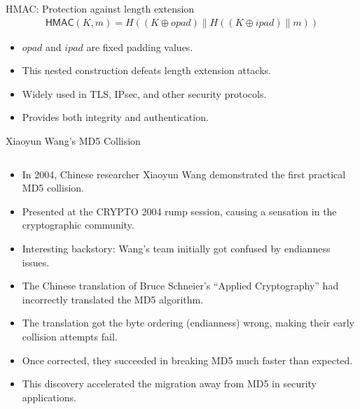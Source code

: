 \documentclass[aspectratio=169, lualatex, handout]{beamer}
\begin{document}
\begin{frame}{HMAC: Protection against length extension}
	\begin{align*}
		\textsf{HMAC}(K, m) = H((K \oplus opad) \| H((K \oplus ipad) \| m))
	\end{align*}
	\begin{itemize}[<+->]
		\item $opad$ and $ipad$ are fixed padding values.
		\item This nested construction defeats length extension attacks.
		\item Widely used in TLS, IPsec, and other security protocols.
		\item Provides both integrity and authentication.
	\end{itemize}
\end{frame}

\begin{frame}{Xiaoyun Wang's MD5 Collision}
	\begin{columns}[c]
		\begin{column}{1\textwidth}
			\begin{itemize}[<+->]
				\item In 2004, Chinese researcher Xiaoyun Wang demonstrated the first practical MD5 collision.
				\item Presented at the CRYPTO 2004 rump session, causing a sensation in the cryptographic community.
				\item Interesting backstory: Wang's team initially got confused by endianness issues.
				\item The Chinese translation of Bruce Schneier's ``Applied Cryptography'' had incorrectly translated the MD5 algorithm.
				\item The translation got the byte ordering (endianness) wrong, making their early collision attempts fail.
				\item Once corrected, they succeeded in breaking MD5 much faster than expected.
				\item This discovery accelerated the migration away from MD5 in security applications.
			\end{itemize}
		\end{column}
	\end{columns}
\end{frame}
\end{document}
